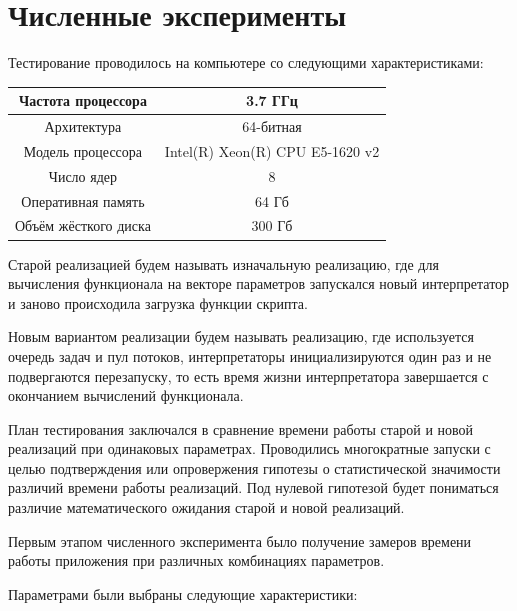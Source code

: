 \section*{Численные эксперименты}

Тестирование проводилось на компьютере со следующими характеристиками:
\bigskip

\begin{tabular}{| c | c |}
    \hline
    Частота процессора & 3.7 ГГц \\ \hline
    Архитектура & 64-битная \\ \hline
    Модель процессора & Intel(R) Xeon(R) CPU E5-1620 v2 \\ \hline
    Число ядер & 8 \\ \hline
    Оперативная память & 64 Гб \\ \hline
    Объём жёсткого диска & 300 Гб \\
    \hline
\end{tabular}
\bigskip

Старой реализацией будем называть
изначальную реализацию,
где для вычисления функционала
на векторе параметров запускался
новый интерпретатор и
заново происходила загрузка
функции скрипта.

Новым вариантом реализации
будем называть реализацию,
где используется очередь задач
и пул потоков,
интерпретаторы инициализируются
один раз и не подвергаются перезапуску,
то есть время жизни интерпретатора
завершается с окончанием
вычислений функционала.

План тестирования заключался
в сравнение времени работы
старой и новой реализаций
при одинаковых параметрах.
Проводились многократные запуски
с целью подтверждения или опровержения
гипотезы о статистической значимости различий
времени работы реализаций.
Под нулевой гипотезой будет пониматься
различие математического ожидания
старой и новой реализаций.

Первым этапом численного эксперимента
было получение замеров времени
работы приложения
при различных комбинациях параметров.

Параметрами были выбраны следующие характеристики:

